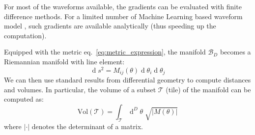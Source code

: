 \documentclass[twocolumn,showpacs,preprintnumbers,nofootinbib,prd,
superscriptaddress,10pt]{revtex4-2}
\renewcommand{\d}[1]{\ensuremath{\operatorname{d}\!{#1}}}
\newcommand{\dvol}[2]{\ensuremath{\operatorname{d}^{#2}\!{#1}}}
\begin{document}
For most of the waveforms available, the gradients can be evaluated with finite difference methods. For a limited number of Machine Learning based waveform model \cite{Khan:2020fso, PhysRevD.103.043020, ML_wf_model, Tissino:2022thn}, such gradients are available analytically (thus speeding up the computation).


Equipped with the metric eq.~\eqref{eq:metric_expression}, the manifold $\mathcal{B}_D$ becomes a Riemannian manifold with line element:
\begin{equation}\label{eq:line_element}
	\d{s^2} = M_{ij}(\theta) \d{\theta_i} \d{\theta_j}
\end{equation}
We can then use standard results from differential geometry to compute distances and volumes. In particular, the volume of a subset $\mathcal{T}$ (tile) of the manifold can be computed as:
\begin{equation}\label{eq:volume_tile}
	\text{Vol}(\mathcal{T}) = \int_\mathcal{T} \dvol{\theta}{D} \; \sqrt{|M(\theta)|}
\end{equation}
where $|\cdot|$ denotes the determinant of a matrix.
\end{document}
